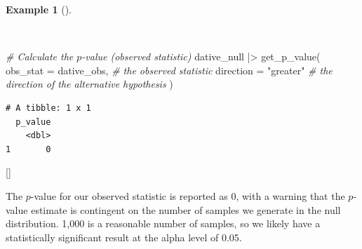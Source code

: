 \documentclass[
  letterpaper,
  krantz1]{latex/krantz-mod}
\newenvironment{Shaded}{\begin{snugshade}}{\end{snugshade}}
\newcommand{\AttributeTok}[1]{\textcolor[rgb]{0.00,0.00,0.00}{#1}}
\newcommand{\CommentTok}[1]{\textcolor[rgb]{0.00,0.00,0.00}{\textit{#1}}}
\newcommand{\ControlFlowTok}[1]{\textcolor[rgb]{0.00,0.00,0.00}{#1}}
\newcommand{\FloatTok}[1]{\textcolor[rgb]{0.00,0.00,0.00}{#1}}
\newcommand{\FunctionTok}[1]{\textcolor[rgb]{0.00,0.00,0.00}{#1}}
\newcommand{\NormalTok}[1]{\textcolor[rgb]{0.00,0.00,0.00}{#1}}
\newcommand{\SpecialCharTok}[1]{\textcolor[rgb]{0.00,0.00,0.00}{#1}}
\newcommand{\StringTok}[1]{\textcolor[rgb]{0.00,0.00,0.00}{#1}}
\newcommand{\cindex}[1]{%
  \StrSubstitute{#1}{_}{\_}[\temp]%
  \index{\temp}%
}
\theoremstyle{definition}
\theoremstyle{definition}
\newtheorem{example}{Example}[chapter]
\theoremstyle{remark}
\begin{document}
\begin{example}[]\protect\hypertarget{exm-infer-cat-p-value}{}\label{exm-infer-cat-p-value}

~

\begin{Shaded}
\begin{Highlighting}[numbers=left,,]
\CommentTok{\# Calculate the $p${-}value (observed statistic)}
\NormalTok{dative\_null }\SpecialCharTok{|\textgreater{}}
  \FunctionTok{get\_p\_value}\NormalTok{(}
    \AttributeTok{obs\_stat =}\NormalTok{ dative\_obs, }\CommentTok{\# the observed statistic}
    \AttributeTok{direction =} \StringTok{"greater"} \CommentTok{\# the direction of the alternative hypothesis}
\NormalTok{  )}
\end{Highlighting}
\end{Shaded}

\begin{verbatim}
# A tibble: 1 x 1
  p_value
    <dbl>
1       0
\end{verbatim}

 \cindex{get_p_value()} 

\begin{Shaded}
\end{Shaded}

\end{example}

The \(p\)-value for our observed statistic is reported as \(0\), with a
warning that the \(p\)-value estimate is contingent on the number of
samples we generate in the null distribution. 1,000 is a reasonable
number of samples, so we likely have a statistically significant result
at the alpha level of 0.05.
\end{document}
